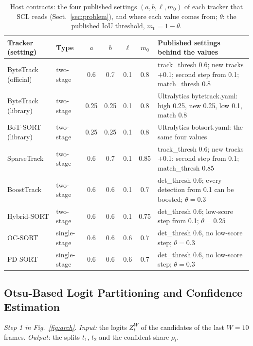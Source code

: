 \documentclass[pdflatex,sn-mathphys-num,iicol]{sn-jnl}
\newcommand{\scl}{SCL}
\begin{document}
\begin{table}[!t]
\caption{Host contracts: the four published settings $(a,b,\ell,m_0)$ of each tracker that \scl{}
reads (Sect.~\ref{sec:problem}), and where each value comes from; $\theta$: the published IoU
threshold, $m_0=1-\theta$.}
\label{tab:contracts}
\centering\footnotesize
\setlength{\tabcolsep}{4pt}
\begin{tabular}{@{}llcccc>{\raggedright\arraybackslash}p{84mm}@{}}
\toprule
Tracker (setting) & Type & $a$ & $b$ & $\ell$ & $m_0$ & Published settings behind the values\\
\midrule
ByteTrack (official) & two-stage & 0.6 & 0.7 & 0.1 & 0.8 & track\_thresh 0.6; new tracks $+$0.1; second step from 0.1; match\_thresh 0.8\\
ByteTrack (library) & two-stage & 0.25 & 0.25 & 0.1 & 0.8 & Ultralytics bytetrack.yaml: high 0.25, new 0.25, low 0.1, match 0.8\\
BoT-SORT (library) & two-stage & 0.25 & 0.25 & 0.1 & 0.8 & Ultralytics botsort.yaml: the same four values\\
SparseTrack & two-stage & 0.6 & 0.7 & 0.1 & 0.85 & track\_thresh 0.6; new tracks $+$0.1; second step from 0.1; match\_thresh 0.85\\
BoostTrack & two-stage & 0.6 & 0.6 & 0.1 & 0.7 & det\_thresh 0.6; every detection from 0.1 can be boosted; $\theta=0.3$\\
Hybrid-SORT & two-stage & 0.6 & 0.6 & 0.1 & 0.75 & det\_thresh 0.6; low-score step from 0.1; $\theta=0.25$\\
OC-SORT & single-stage & 0.6 & 0.6 & 0.6 & 0.7 & det\_thresh 0.6, no low-score step; $\theta=0.3$\\
PD-SORT & single-stage & 0.6 & 0.6 & 0.6 & 0.7 & det\_thresh 0.6, no low-score step; $\theta=0.3$\\
\bottomrule
\end{tabular}
\end{table}

\subsection{Otsu-Based Logit Partitioning and Confidence Estimation}\label{sec:calib}
\emph{Step 1 in Fig.~\ref{fig:arch}. Input:} the logits $Z_t^W$ of the candidates of the last $W=10$
frames. \emph{Output:} the splits $t_1$, $t_2$ and the confident share $\rho_t$.
\end{document}
